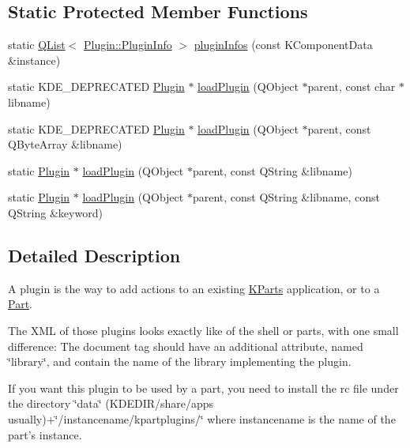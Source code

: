 \subsection*{Static Protected Member Functions}
\begin{DoxyCompactItemize}
\item 
static \hyperlink{classQList}{Q\+List}$<$ \hyperlink{structKParts_1_1Plugin_1_1PluginInfo}{Plugin\+::\+Plugin\+Info} $>$ \hyperlink{classKParts_1_1Plugin_a00fa7c83044416dbe32dcef7672fb7a5}{plugin\+Infos} (const K\+Component\+Data \&instance)
\item 
static K\+D\+E\+\_\+\+D\+E\+P\+R\+E\+C\+A\+T\+E\+D \hyperlink{classKParts_1_1Plugin}{Plugin} $\ast$ \hyperlink{classKParts_1_1Plugin_adf61fe555a87f5ad3bf84c5e16a97e31}{load\+Plugin} (Q\+Object $\ast$parent, const char $\ast$libname)
\item 
static K\+D\+E\+\_\+\+D\+E\+P\+R\+E\+C\+A\+T\+E\+D \hyperlink{classKParts_1_1Plugin}{Plugin} $\ast$ \hyperlink{classKParts_1_1Plugin_a1479723a42f26aa8b4fd843e00976d5b}{load\+Plugin} (Q\+Object $\ast$parent, const Q\+Byte\+Array \&libname)
\item 
static \hyperlink{classKParts_1_1Plugin}{Plugin} $\ast$ \hyperlink{classKParts_1_1Plugin_ae2c2c4b6f736f5236bc5d4f2b20710a1}{load\+Plugin} (Q\+Object $\ast$parent, const Q\+String \&libname)
\item 
static \hyperlink{classKParts_1_1Plugin}{Plugin} $\ast$ \hyperlink{classKParts_1_1Plugin_a7fef84c255c7ed61b4548258fbaf3a68}{load\+Plugin} (Q\+Object $\ast$parent, const Q\+String \&libname, const Q\+String \&keyword)
\end{DoxyCompactItemize}


\subsection{Detailed Description}
A plugin is the way to add actions to an existing \hyperlink{namespaceKParts}{K\+Parts} application, or to a \hyperlink{classKParts_1_1Part}{Part}.

The X\+M\+L of those plugins looks exactly like of the shell or parts, with one small difference\+: The document tag should have an additional attribute, named \char`\"{}library\char`\"{}, and contain the name of the library implementing the plugin.

If you want this plugin to be used by a part, you need to install the rc file under the directory \char`\"{}data\char`\"{} (K\+D\+E\+D\+I\+R/share/apps usually)+\char`\"{}/instancename/kpartplugins/\char`\"{} where instancename is the name of the part's instance.

